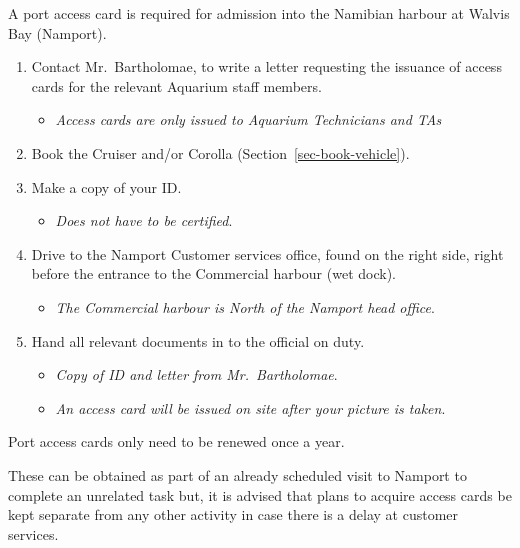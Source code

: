 \documentclass[
  12pt,
]{report}
\providecommand{\tightlist}{%
  \setlength{\itemsep}{0pt}\setlength{\parskip}{0pt}}\usepackage{longtable,booktabs,array}
\begin{document}
A port access card is required for admission into the Namibian harbour
at Walvis Bay (Namport).

\begin{enumerate}
\def\labelenumi{\arabic{enumi}.}
\tightlist
\item
  Contact Mr.~Bartholomae, to write a letter requesting the issuance of
  access cards for the relevant Aquarium staff members.

  \begin{itemize}
  \tightlist
  \item
    \emph{Access cards are only issued to Aquarium Technicians and TAs}
  \end{itemize}
\item
  Book the Cruiser and/or Corolla (Section~\ref{sec-book-vehicle}).
\item
  Make a copy of your ID.

  \begin{itemize}
  \tightlist
  \item
    \emph{Does not have to be certified}.
  \end{itemize}
\item
  Drive to the Namport Customer services office, found on the right
  side, right before the entrance to the Commercial harbour (wet dock).

  \begin{itemize}
  \tightlist
  \item
    \emph{The Commercial harbour is North of the Namport head office}.
  \end{itemize}
\item
  Hand all relevant documents in to the official on duty.

  \begin{itemize}
  \tightlist
  \item
    \emph{Copy of ID and letter from Mr.~Bartholomae}.
  \item
    \emph{An access card will be issued on site after your picture is
    taken}.
  \end{itemize}
\end{enumerate}

{Port access cards only need to be renewed once a year}.

These can be obtained as part of an already scheduled visit to Namport
to complete an unrelated task but, it is advised that plans to acquire
access cards be kept separate from any other activity in case there is a
delay at customer services.
\end{document}
